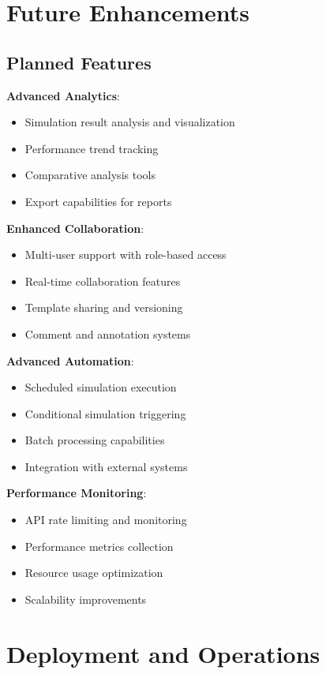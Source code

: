 \documentclass[12pt,a4paper]{article}
\begin{document}
\section{Future Enhancements}

\subsection{Planned Features}

\textbf{Advanced Analytics}:
\begin{itemize}
    \item Simulation result analysis and visualization
    \item Performance trend tracking
    \item Comparative analysis tools
    \item Export capabilities for reports
\end{itemize}

\textbf{Enhanced Collaboration}:
\begin{itemize}
    \item Multi-user support with role-based access
    \item Real-time collaboration features
    \item Template sharing and versioning
    \item Comment and annotation systems
\end{itemize}

\textbf{Advanced Automation}:
\begin{itemize}
    \item Scheduled simulation execution
    \item Conditional simulation triggering
    \item Batch processing capabilities
    \item Integration with external systems
\end{itemize}

\textbf{Performance Monitoring}:
\begin{itemize}
    \item API rate limiting and monitoring
    \item Performance metrics collection
    \item Resource usage optimization
    \item Scalability improvements
\end{itemize}

\section{Deployment and Operations}
\end{document}
